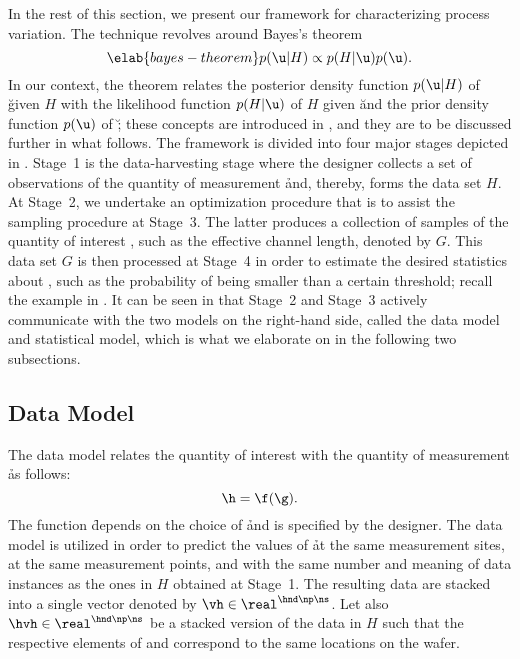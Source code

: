 In the rest of this section, we present our framework for characterizing process
variation. The technique revolves around Bayes's theorem \cite{gelman2013}
\begin{equation} \elab{bayes-theorem}
  p(\u | H) \propto p(H | \u) p(\u).
\end{equation}
In our context, the theorem relates the posterior density function $p(\u |H)$ of
\u given $H$ with the likelihood function $p(H | \u)$ of $H$ given \u and the
prior density function $p(\u)$ of \u; these concepts are introduced in
, and they are to be discussed further in what
follows. The framework is divided into four major stages depicted in
. Stage~1 is the data-harvesting stage where the designer
collects a set of observations of the quantity of measurement \h and, thereby,
forms the data set $H$. At Stage~2, we undertake an optimization procedure that
is to assist the sampling procedure at Stage~3. The latter produces a collection
of samples of the quantity of interest \g, such as the effective channel length,
denoted by $G$. This data set $G$ is then processed at Stage~4 in order to
estimate the desired statistics about \g, such as the probability of \g being
smaller than a certain threshold; recall the example in .
It can be seen in  that Stage~2 and Stage~3 actively
communicate with the two models on the right-hand side, called the data model
and statistical model, which is what we elaborate on in the following two
subsections.

\subsection{Data Model}

The data model relates the quantity of interest \g with the quantity of
measurement \h as follows:
\[
  \h = \f(\g).
\]
The function \f depends on the choice of \h and is specified by the designer.
The data model is utilized in order to predict the values of \h at the same
measurement sites, at the same measurement points, and with the same number and
meaning of data instances as the ones in $H$ obtained at Stage~1. The resulting
data are stacked into a single vector denoted by $\vh \in \real^{\hnd \np \ns}$.
Let also $\hvh \in \real^{\hnd \np \ns}$ be a stacked version of the data in $H$
such that the respective elements of \vh and \hvh correspond to the same
locations on the wafer.

